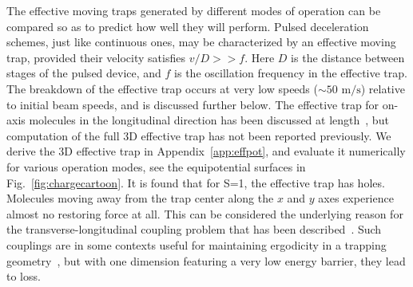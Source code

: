 \documentclass[%
 reprint,
 amsmath,amssymb,
 aps,
prl,
]{revtex4-1}
\newcommand{\SO}{{S=1}}
\begin{document}
The effective moving traps generated by different modes of operation can be compared so as to predict how well they will perform.
Pulsed deceleration schemes, just like continuous ones, may be characterized by an effective moving trap, provided their velocity satisfies $v/D >> f$. 
Here $D$ is the distance between stages of the pulsed device, and $f$ is the oscillation frequency in the effective trap. 
The breakdown of the effective trap occurs at very low speeds ($\sim\!\!50\text{ m/s}$) relative to initial beam speeds, and is discussed further below.
The effective trap for on-axis molecules in the longitudinal direction has been discussed at length~\cite{Bethlem2000,Hudson2004}, but computation of the full 3D effective trap has not been reported previously.
We derive the 3D effective trap in Appendix~\ref{app:effpot}, and evaluate it numerically for various operation modes, see the equipotential surfaces in Fig.~\ref{fig:chargecartoon}.
It is found that for \SO, the effective trap has holes. 
Molecules moving away from the trap center along the $x$ and $y$ axes experience almost no restoring force at all. 
This can be considered the underlying reason for the transverse-longitudinal coupling problem that has been described~\cite{VanDeMeerakker2006}. 
Such couplings are in some contexts useful for maintaining ergodicity in a trapping geometry~\cite{Surkov1996}, but with one dimension featuring a very low energy barrier, they lead to loss.
\end{document}
